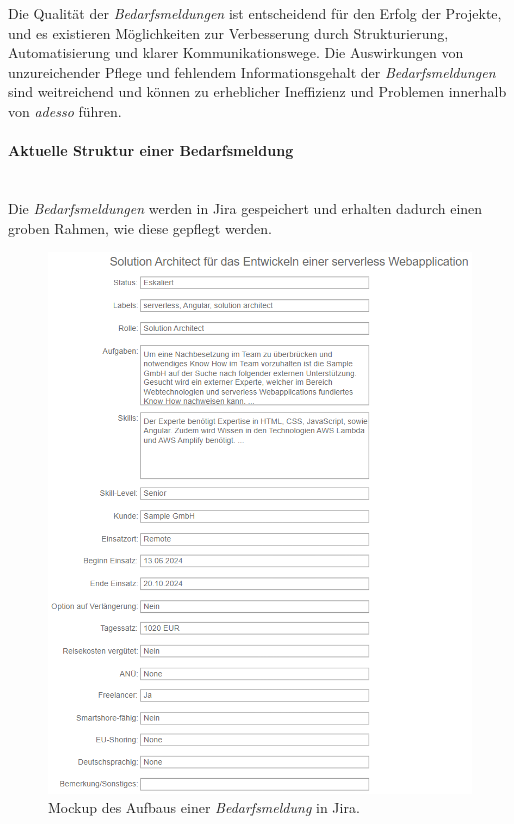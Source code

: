 Die Qualität der \emph{Bedarfsmeldungen} ist entscheidend für den Erfolg der Projekte, und es existieren Möglichkeiten zur Verbesserung durch Strukturierung, Automatisierung und klarer Kommunikationswege. Die Auswirkungen von unzureichender Pflege und fehlendem Informationsgehalt der \emph{Bedarfsmeldungen} sind weitreichend und können zu erheblicher Ineffizienz und Problemen innerhalb von \emph{adesso} führen.
\paragraph{Aktuelle Struktur einer Bedarfsmeldung}\mbox{} \\
Die \emph{Bedarfsmeldungen} werden in Jira gespeichert und erhalten dadurch einen groben Rahmen, wie diese gepflegt werden.
\begin{figure}[H]%
	\centering  
	\includegraphics[scale=1]{Abbildungen/jiraBefore.png}
	\caption{Mockup des Aufbaus einer \emph{Bedarfsmeldung} in Jira.}
	\label{fig:jirabefore}
\end{figure}\mbox{} \\
